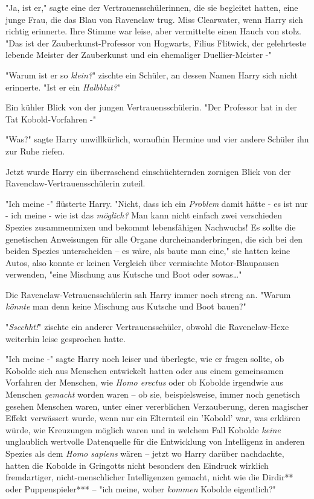 {"Ja, ist er," sagte eine der Vertrauensschülerinnen, die sie begleitet hatten, eine junge Frau, die das Blau von Ravenclaw trug. Miss Clearwater, wenn Harry sich richtig erinnerte. Ihre Stimme war leise, aber vermittelte einen Hauch von stolz. "Das ist der Zauberkunst-Professor von Hogwarts, Filius Flitwick, der gelehrteste lebende Meister der Zauberkunst und ein ehemaliger Duellier-Meister -"

"Warum ist er so \emph{klein?}" zischte ein Schüler, an dessen Namen Harry sich nicht erinnerte. "Ist er ein \emph{Halbblut?}"

Ein kühler Blick von der jungen Vertrauensschülerin. "Der Professor hat in der Tat Kobold-Vorfahren -"

"Was?" sagte Harry unwillkürlich, woraufhin Hermine und vier andere Schüler ihn zur Ruhe riefen.

Jetzt wurde Harry ein überraschend einschüchternden zornigen Blick von der Ravenclaw-Vertrauensschülerin zuteil.

"Ich meine -" flüsterte Harry. "Nicht, dass ich ein \emph{Problem} damit hätte - es ist nur - ich meine - wie ist das \emph{möglich?} Man kann nicht einfach zwei verschieden Spezies zusammenmixen und bekommt lebensfähigen Nachwuchs! Es sollte die genetischen Anweisungen für alle Organe durcheinanderbringen, die sich bei den beiden Spezies unterscheiden -- es wäre, als baute man eine," sie hatten keine Autos, also konnte er keinen Vergleich über vermischte Motor-Blaupausen verwenden, "eine Mischung aus Kutsche und Boot oder sowas…"

Die Ravenclaw-Vetrauensschülerin sah Harry immer noch streng an. "Warum \emph{könnte} man denn keine Mischung aus Kutsche und Boot bauen?"

"\emph{Sscchht!}" zischte ein anderer Vertrauensschüler, obwohl die Ravenclaw-Hexe weiterhin leise gesprochen hatte.

"Ich meine -" sagte Harry noch leiser und überlegte, wie er fragen sollte, ob Kobolde sich aus Menschen entwickelt hatten oder aus einem gemeinsamen Vorfahren der Menschen, wie \emph{Homo erectus} oder ob Kobolde irgendwie aus Menschen \emph{gemacht} worden waren -- ob sie, beispielsweise, immer noch genetisch gesehen Menschen waren, unter einer vererblichen Verzauberung, deren magischer Effekt verwässert wurde, wenn nur ein Elternteil ein 'Kobold' war, was erklären würde, wie Kreuzungen möglich waren und in welchem Fall Kobolde \emph{keine} unglaublich wertvolle Datenquelle für die Entwicklung von Intelligenz in anderen Spezies als dem \emph{Homo sapiens} wären -- jetzt wo Harry darüber nachdachte, hatten die Kobolde in Gringotts nicht besonders den Eindruck wirklich fremdartiger, nicht-menschlicher Intelligenzen gemacht, nicht wie die Dirdir** oder Puppenspieler*** -- "ich meine, woher \emph{kommen} Kobolde eigentlich?"

}
